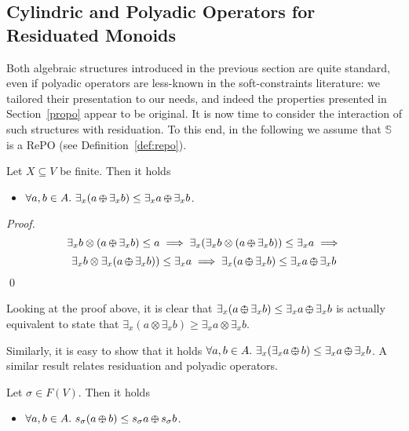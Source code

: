 \documentclass{llncs}
\def\monop{\otimes}
\def\odiv{\, {\ominus\hspace{-7.7pt} \div} \,}
\begin{document}
\subsection{Cylindric and Polyadic Operators for Residuated Monoids}
\label{cyre}
Both algebraic structures introduced in the previous section are quite standard,
even if polyadic operators are less-known in the soft-constraints literature:
we tailored their presentation to our needs, and indeed the properties
presented in Section~\ref{propo} appear to be original. It is now time to consider 
the interaction of such structures with residuation. 
%
To this end, in the following we assume that 
$\mathbb{S}$ is a RePO (see Definition~\ref{def:repo}).


\begin{lemma}
Let $X \subseteq V$ be finite. Then it holds
	\begin{itemize}
         \item $\forall a, b \in A.\ \exists_x(a \odiv \exists_x b) \leq \exists_x a \odiv \exists_x b$.
	\end{itemize}
\end{lemma}

\begin{proof}
 \[\exists_x b \otimes (a \odiv \exists_x b) \leq a \implies
   \exists_x(\exists_x b \otimes (a \odiv \exists_x b)) \leq \exists_x a \implies\]
 \[\exists_x b \otimes \exists_x(a \odiv \exists_x b)) \leq \exists_x a \implies
   \exists_x(a \odiv \exists_x b) \leq \exists_x a \odiv \exists_x b\]
   \qed
\end{proof}

\begin{remark}
Looking at the proof above, it is clear that $\exists_x(a \odiv \exists_x b) \leq \exists_x a \odiv \exists_x b$
is actually equivalent to state that
$\exists_x(a \monop \exists_x b) \geq \exists_x a \monop \exists_x b$.
\end{remark}


Similarly, it is easy to show that it holds $\forall a, b \in A.\ \exists_x(\exists_x a \odiv b) \leq \exists_x a \odiv \exists_x b$. 
%
A similar result relates residuation and polyadic operators.

\begin{lemma}
Let $\sigma \in F(V)$. Then it holds
\begin{itemize}
\item $\forall a,b \in A.\ s_\sigma (a \odiv b) \leq s_\sigma a \odiv s_\sigma b$.
\end{itemize}
\end{lemma}
\end{document}
